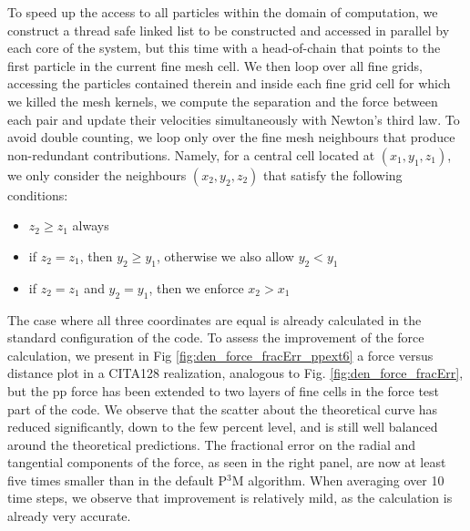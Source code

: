 \documentclass[useAMS,usenatbib]{mn2e}
\begin{document}
 To speed up the access to all particles within the domain of computation, we construct a thread safe linked list
 to be constructed and accessed in parallel by each core of the system, but this time with a head-of-chain that points to the first particle in the current fine mesh cell. 
 We then loop over all fine grids, accessing the particles contained therein and inside each fine grid cell for which we killed the mesh kernels,
 we compute the separation and the force between each pair and update their velocities simultaneously with Newton's third law. 
 To avoid double counting, we loop only over the fine mesh neighbours that produce non-redundant contributions. Namely, for a central cell located at 
 $(x_1, y_1, z_1)$, we only consider the neighbours $(x_2, y_2, z_2)$ that satisfy the following conditions:
 \begin{itemize}
 \item{$z_2 \ge z_1$ always}
 \item{if $z_2 = z_1$, then $y_2 \ge y_1$, otherwise we also allow $y_2 < y_1$} 
 \item{if $z_2 = z_1$ and $y_2 = y_1$, then we enforce $x_2 > x_1$}
 \end{itemize}
 The case where all three coordinates are equal is already calculated in the standard configuration of the code.
 To assess the improvement of the force calculation, we present in Fig \ref{fig:den_force_fracErr_ppext6} a force versus distance
 plot in a CITA128 realization, analogous to Fig. \ref{fig:den_force_fracErr}, but the pp force has been extended to  two layers of fine cells
 in the force test part of the code. 
 We observe that the scatter about the theoretical curve has reduced significantly, down to the few percent level, 
 and is still well balanced around the theoretical predictions.
 The fractional error on the radial and tangential components of the force, as seen in the right panel,
 are now at least five times smaller than in the default P$^{3}$M algorithm.
 When averaging over 10 time steps, we observe that improvement is relatively mild, as the calculation is already very accurate. 
 
\end{document}
